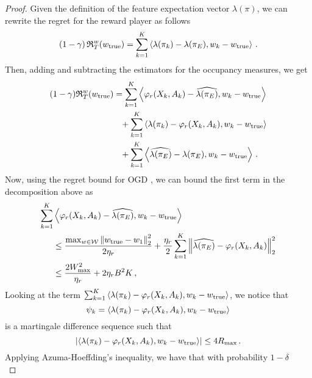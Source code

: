 \begin{proof}
    Given the definition of the feature expectation vector $\lambda (\pi)$, we can rewrite the regret for the reward player as follows
    \begin{equation*}
        \left( 1 - \gamma \right) \mathfrak{R}_T^w(w_{\mathrm{true}}) = \sum^K_{k=1} \left\langle{\lambda(\pi_k) - \lambda({\pi_E})},{w_k - w_{\mathrm{true}}}\right\rangle\,.
    \end{equation*}
    Then, adding and subtracting the estimators for the occupancy measures, we get
    \begin{align*}
        (1-\gamma) \mathfrak{R}_T^w(w_{\mathrm{true}}) &= \sum^K_{k=1} \left\langle{\varphi_r(X_k, A_k) - \widehat{\lambda({\pi_E})}},{w_k - w_{\mathrm{true}} }\right\rangle \\
        &\phantom{=}+ \sum^K_{k=1} \left\langle{\lambda(\pi_k) - \varphi_r(X_k, A_k)},{w_k - w_{\mathrm{true}}}\right\rangle \\
        &\phantom{=}+ \sum^K_{k=1} \left\langle{\widehat{\lambda({\pi_E})} - \lambda({\pi_E})},{ w_k-w_{\mathrm{true}}}\right\rangle\,.
    \end{align*}
    Now, using the regret bound for OGD \citep{Zin03}, we can bound the first term in the decomposition above as
    \begin{align*}
        \sum^K_{k=1} &\left\langle{\varphi_r(X_k, A_k) - \widehat{\lambda({\pi_E})}},{w_k-w_{\mathrm{true}} }\right\rangle \\&\leq  \frac{\max_{w\in\mathcal{W}}\left\|w_{\mathrm{true}} - w_1\right\|_2^2}{2 \eta_r} + \frac{\eta_r}{2} \sum^K_{k=1} \left\|\widehat{\lambda({\pi_E})} - \varphi_r(X_k, A_k)\right\|_2^2 \\
        &\leq \frac{2 W_{\max}^2}{\eta_r} + 2 \eta_r B^2 K\,,
    \end{align*}
    Looking at the term $\sum^K_{k=1} \left\langle{\lambda (\pi_k) - \varphi_r(X_k, A_k)},{w_k - w_{\mathrm{true}}}\right\rangle$, we notice that
    \begin{equation*}
        \psi_k = \left\langle{\lambda(\pi_k) - \varphi_r(X_k, A_k)},{w_k - w_{\mathrm{true}}}\right\rangle
    \end{equation*}
    is a martingale difference sequence such that
    \begin{equation*}
        \left|\left\langle{\lambda(\pi_k) - \varphi_r(X_k, A_k)},{w_k - w_{\mathrm{true}}}\right\rangle\right| \leq  4 R_{\max}\,.
    \end{equation*}
    Applying Azuma-Hoeffding's inequality, we have that with probability $1 - \delta$
    \begin{equation*}

\end{equation*}
\end{proof}
